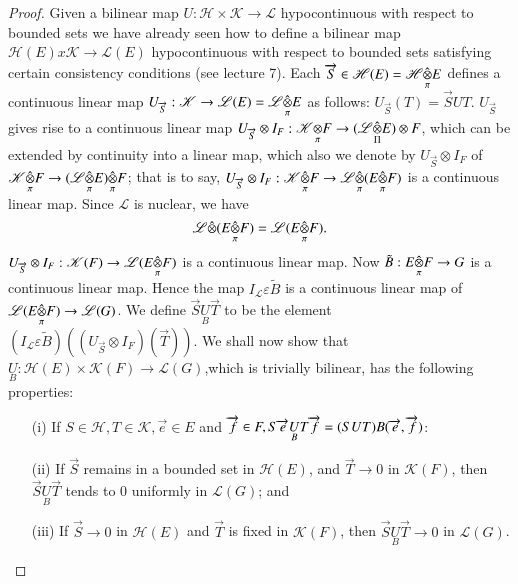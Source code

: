 \begin{proof}
Given a bilinear map $U : \mathscr{H}\times \mathscr{K} \to \mathscr{L}$
hypocontinuous with respect to bounded sets we have already seen how
to define a bilinear map $\mathscr{H}(E) x \mathscr{K} \to
\mathscr{L}(E)$ hypocontinuous with respect to bounded sets satisfying
certain consistency conditions (see lecture 7). Each
$\overrightarrow{S} \in \mathscr{H}(E) = \fohprod{\mathscr{H}}{E}{\pi}$
defines a continuous linear map $U_{\overrightarrow{S}}: \mathscr{K}
\to \mathscr{L}(E) = \fohprod{\mathscr{L}}{E}{\pi}$ as follows:
$U_{\overrightarrow{S}}(T) = \overrightarrow{S} U
T$. $U_{\overrightarrow{S}}$ gives rise to a continuous linear map
$U_{\overrightarrow{S}}\otimes I_F :\foprod{\mathscr{K}}{F}{\pi}\to
(\fohprod{\mathscr{L}}{E}{\Pi})\otimes F$, which can be extended by 
continuity into a linear map, which also we denote by
$U_{\overrightarrow{S}} \otimes I_F$ of $\fohprod{\mathscr{K}}{F}{\pi}
\to (\fohprod{\mathscr{L}}{E}{\pi})\fohprod{}{F}{\pi}$;
that is to say, $U_{\overrightarrow{S}}\otimes I_F
:\fohprod{\mathscr{K}}{F}{\pi} \to\fohprod{\mathscr{L}}{}{\pi}
(\fohprod{E}{F}{\pi})$ is a continuous linear map. Since $\mathscr{L}$
is nuclear, we have  
$$
\mathscr{L} \hat{\otimes} (\fohprod{E}{F}{\pi}) =
\mathscr{L}(\fohprod{E}{F}{\pi}).
$$
$U_{\overrightarrow{S}} \otimes I_F : \mathscr{K}(F) \to
\mathscr{L}(\fohprod{E}{F}{\pi})$ is a continuous linear
map. Now $\tilde{B} :\fohprod{E}{F}{\pi} \to G$ is a
continuous linear map. Hence the map $I_{\mathscr{L}} \varepsilon
  \tilde{B}$ is a continuous linear map of $\mathscr{L}(\fohprod{E}{F}
{\pi}) \to \mathscr{L}(G)$. We define $\overrightarrow{S}
\underset{B}{U} \overrightarrow{T}$ to be the element
$(I_{\mathscr{L}} \varepsilon \tilde{B})((U_{\overrightarrow{S}} \otimes
I_F)(\overrightarrow{T}))$. We shall now show that $\underset{B}{U}
: \mathscr{H}(E) \times \mathscr{K}(F) \to
\mathscr{L}(G)$,\pageoriginale which is trivially bilinear, has the
  following properties: 
\begin{itemize}
\item [(i)] If $S \in \mathscr{H}, T \in \mathscr{K},
  \overrightarrow{e} \in E$ and $\overrightarrow{f} \in F, S
  \overrightarrow{e} \underset{B}{U} T \overrightarrow{f} = (S U T)\break
  B(\overrightarrow{e}, \overrightarrow{f})$:
\item [(ii)] If $\overrightarrow{S}$ remains in a bounded set in
  $\mathscr{H}(E)$, and $\overrightarrow{T} \to 0$ in
  $\mathscr{K}(F)$, then $\overrightarrow{S} \underset{B}{U}
  \overrightarrow{T}$ tends to $0$ uniformly in $\mathscr{L}(G)$; and 
\item [(iii)] If $\overrightarrow{S} \to 0$ in $\mathscr{H}(E)$ and
  $\overrightarrow{T}$ is fixed in $\mathscr{K}(F)$, then
  $\overrightarrow{S} \underset{B}{U} \overrightarrow{T} \to 0$ in
  $\mathscr{L}(G)$. 
\end{itemize}


\end{proof}
